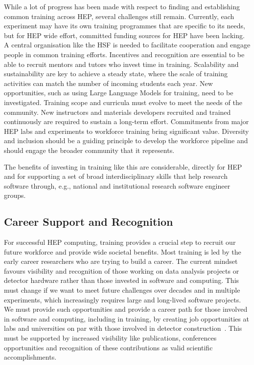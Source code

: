 \documentclass[10pt,a4paper]{article}
\begin{document}
While a lot of progress has been made with respect to finding and establishing
common training across HEP, several challenges still remain. Currently, each
experiment may have its own training programmes that are specific to its
needs, but for HEP wide effort, committed funding sources for HEP have been
lacking. A central organisation like the HSF is needed to facilitate cooperation
and engage people in common training efforts. Incentives and recognition are
essential to be able to recruit mentors and tutors who invest time in training.
Scalability and sustainability are key to achieve a steady state, where the
scale of training activities can match the number of incoming students each year.
New opportunities, such as using Large Language Models for training, need to be investigated.
Training scope and curricula must evolve to meet the needs of the community.
New instructors and materials developers recruited and trained continuously are required to
sustain a long-term effort. 
Commitments from major HEP labs and experiments to workforce training bring significant value. 
Diversity
and inclusion should be a guiding principle to develop the workforce pipeline
and should engage the broader community that it represents.

The benefits of investing in training like this are considerable, directly for
HEP and for supporting a set of broad interdisciplinary skills that help
research software through, e.g., national and institutional research software
engineer groups.

\subsection{Career Support and
Recognition}\label{career-support-and-recognition}

For successful HEP computing, training provides a crucial step to recruit our
future workforce and provide wide societal benefits. Most training is led by the
early career researchers who are trying to build a career. The current mindset
favours visibility and recognition of those working on data analysis projects or
detector hardware rather than those invested in software and computing. This
must change if we want to meet future challenges over decades and in multiple
experiments, which increasingly requires large and long-lived software projects.
We must provide such opportunities and provide a career path for those
involved in software and computing, including in training, by creating job
opportunities at labs and universities on par with those involved in detector
construction~\cite{hsfcwp}. This must be supported by increased visibility like publications,
conferences opportunities and recognition of these contributions as valid
scientific accomplishments.
\end{document}
